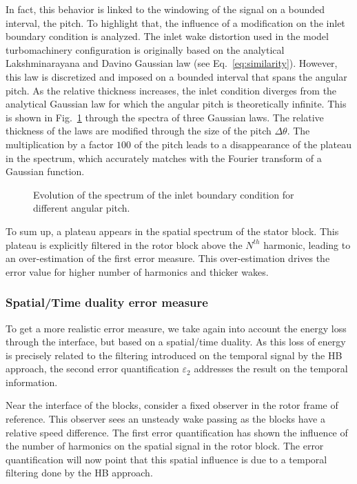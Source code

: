 In fact, this behavior is linked to the windowing of the signal on 
a bounded interval, the pitch. To highlight that, the influence of 
a modification on the inlet boundary condition is analyzed.
The inlet wake distortion used in the model turbomachinery configuration is 
originally based on the analytical Lakshminarayana and Davino 
Gaussian law (see Eq.~\eqref{eq:similarity}). However, 
this law is discretized and imposed on a bounded interval 
that spans the angular pitch. As the relative thickness 
increases, the inlet condition diverges from the analytical 
Gaussian law for which the angular pitch is theoretically 
infinite. This is shown in Fig.~\ref{fig:inlet_law_fft} 
through the spectra of three Gaussian laws. The relative 
thickness of the laws are modified through the size 
of the pitch $\Delta \theta$. The multiplication by a factor $100$ 
of the pitch leads to a disappearance of the plateau 
in the spectrum, which accurately matches with the 
Fourier transform of a Gaussian function. 
\begin{figure}[htb]
  \centering
  \caption{Evolution of the spectrum of the inlet boundary condition for different angular pitch.}
  \label{fig:inlet_law_fft}
\end{figure}

To sum up, a plateau appears in the spatial spectrum of the
stator block. This plateau is explicitly filtered in the
rotor block above the $N^{th}$ harmonic, leading to an over-estimation of the 
first error measure. This over-estimation drives the error value
for higher number of harmonics and thicker wakes.

\subsubsection{Spatial/Time duality error measure}
To get a more realistic error measure, we take 
again into account the energy loss
through the interface, but based on a spatial/time duality. 
As this loss of energy is 
precisely related to the filtering 
introduced on the temporal signal by the HB approach, the second 
error quantification $\varepsilon_2$ addresses the result on 
the temporal information. 

Near the interface of the blocks, consider a fixed observer in
the rotor frame of reference. This observer sees an unsteady 
wake passing as the blocks have a relative speed difference.
The first error quantification has shown the 
influence of the number of harmonics on the spatial signal 
in the rotor block. The error quantification will now
point that this spatial influence is due to a temporal filtering done by
the HB approach.

